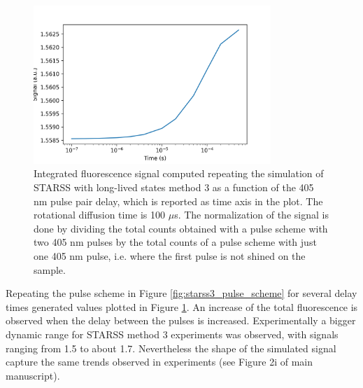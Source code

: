\documentclass{article}
\begin{document}
\begin{figure}[h!]
    \centering
    \includegraphics[width=0.8\textwidth]
    {figures/starss3_signals.png}
    \caption[Simulated signals of STARSS method 3]
    {Integrated fluorescence signal computed repeating the simulation of STARSS with long-lived states method 3 as a function of the 405 nm pulse pair delay, which is reported as time axis in the plot. The rotational diffusion time is 100 $\mu$s. The normalization of the signal is done by dividing the total counts obtained with a pulse scheme with two 405 nm pulses by the total counts of a pulse scheme with just one 405 nm pulse, i.e. where the first pulse is not shined on the sample.}
    \label{fig:starss3_signals}
\end{figure}

Repeating the pulse scheme in Figure \ref{fig:starss3_pulse_scheme} for several delay times generated values plotted in Figure \ref{fig:starss3_signals}. An increase of the total fluorescence is observed when the delay between the pulses is increased.
Experimentally a bigger dynamic range for STARSS method 3 experiments was observed, with signals ranging from 1.5 to about 1.7. Nevertheless the shape of the simulated signal capture the same trends observed in experiments (see Figure 2i of main manuscript).


\clearpage
\printbibliography[heading=bibintoc, title={References}]
\end{document}
